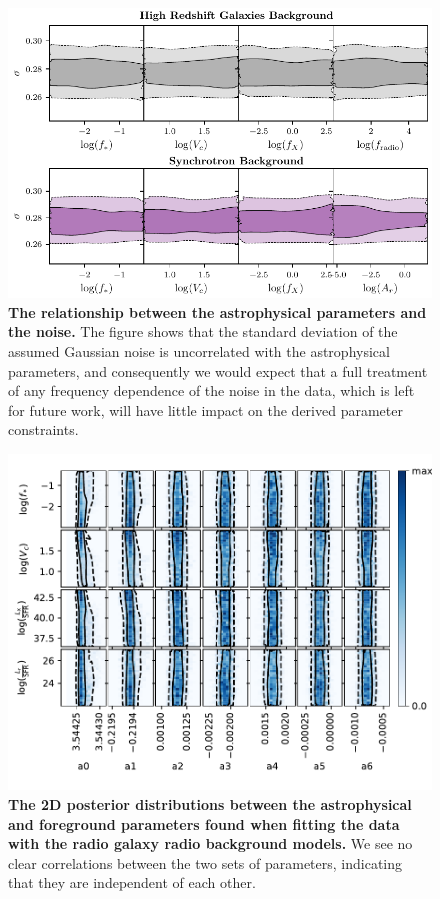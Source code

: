 \begin{figure}
    \centering
    \includegraphics{saras3/figs/Figure2.pdf}
    \caption{\textbf{The relationship between the astrophysical parameters and the noise.} The figure shows that the standard deviation of the assumed Gaussian noise is uncorrelated with the astrophysical parameters, and consequently we would expect that a full treatment of any frequency dependence of the noise in the data, which is left for future work, will have little impact on the derived parameter constraints.}
    \label{fig:noise}
\end{figure}

\begin{figure}
    \centering
    \includegraphics{saras3/figs/Figure3.pdf}
    \caption{\textbf{The 2D posterior distributions between the astrophysical and foreground parameters found when fitting the data with the radio galaxy radio background models.} We see no clear correlations between the two sets of parameters, indicating that they are independent of each other.}
    \label{fig:correlations}
\end{figure}

